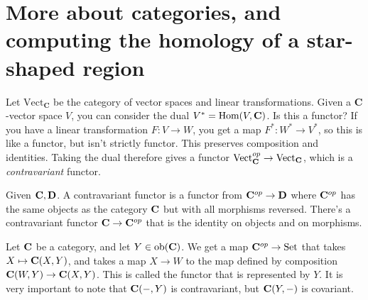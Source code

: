 \section{More about categories, and computing the homology of a star-shaped region}
Let $\mathrm{Vect}_{\mathbf{C}}$ be the category of vector spaces and linear transformations. Given a $\mathbf{C}$-vector space $V$, you can consider the dual $V^\ast=\operatorname{Hom}(V,\mathbf C)$. Is this a functor? If you have a linear transformation $F:V\to W$, you get a map $F^\ast:W^\ast\to V^\ast$, so this is like a functor, but isn't strictly functor. This preserves composition and identities. Taking the dual therefore gives a functor $\mathrm{Vect}_\mathbf C^{op}\to\mathrm{Vect}_\mathbf C$, which is a \textit{contravariant} functor.
\begin{definition}
Given $\mathbf C,\mathbf D$. A contravariant functor is a functor from $\mathbf C^{op}\to\mathbf D$ where $\mathbf C^{op}$ has the same objects as the category $\mathbf C$ but with all morphisms reversed. There's a contravariant functor $\mathbf C\to\mathbf C^{op}$ that is the identity on objects and on morphisms.
\end{definition}
Let $\mathbf C$ be a category, and let $Y\in\mathrm{ob}(\mathbf C)$. We get a map $\mathbf C^{op}\to{\mathrm{Set}}$ that takes $X\mapsto \mathbf C(X,Y)$, and takes a map $X\to W$ to the map defined by composition $\mathbf C(W,Y)\to \mathbf C(X,Y)$. This is called the functor that is represented by $Y$. It is very important to note that $\mathbf C(-,Y)$ is contravariant, but $\mathbf C(Y,-)$ is covariant.

